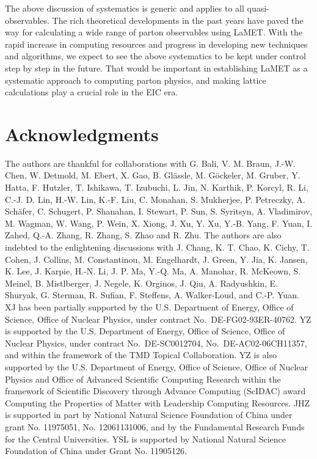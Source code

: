 \documentclass[aps,rmp,reprint,amsmath,amssymb,graphicx,longbibliography]{revtex4-1} %
\begin{document}
The above discussion of systematics is generic and applies to all quasi-observables. The rich theoretical developments in the past years have paved the way for calculating a wide range of parton observables using LaMET. With the rapid increase in computing resources and progress in developing new techniques and algorithms, we expect to see the above systematics to be kept under control step by step in the future. That would be important in establishing LaMET as a systematic approach to computing parton physics, and making lattice calculations play a crucial role in the EIC era.


\section*{Acknowledgments}

The authors are thankful for collaborations with G. Bali, V. M. Braun, J.-W. Chen, W. Detmold, M. Ebert, X. Gao, B. Gl\"assle, M. G\"ockeler, M. Gruber, Y. Hatta, F. Hutzler, T. Ishikawa, T. Izubuchi, L. Jin, N. Karthik, P. Korcyl, R. Li, C.-J. D. Lin, H.-W. Lin, K.-F. Liu, C. Monahan, S. Mukherjee, P. Petreczky, A. Sch\"{a}fer, C. Schugert, P. Shanahan, I. Stewart, P. Sun, S. Syritsyn, A. Vladimirov, M. Wagman, W. Wang, P. Wein, X. Xiong, J. Xu, Y. Xu, Y.-B. Yang, F. Yuan, I. Zahed, Q.-A. Zhang, R. Zhang, S. Zhao and R. Zhu. The authors are also indebted to the enlightening discussions with J. Chang, K. T. Chao, K. Cichy, T. Cohen, J. Collins, M. Constantinou, M. Engelhardt, J. Green, Y. Jia, K. Jansen, K. Lee, J. Karpie, H.-N. Li,
J. P. Ma, Y.-Q. Ma, A. Manohar, R. McKeown, S. Meinel, B. Mistlberger, J. Negele, K. Orginos, J. Qiu, A. Radyushkin, E. Shuryak, G. Sterman, R. Sufian, F. Steffens, A. Walker-Loud, and C.-P. Yuan. XJ has been partially supported by the U.S. Department of Energy, Office of Science, Office of Nuclear Physics, under contract No.~DE-FG02-93ER-40762. YZ is supported by the U.S. Department of Energy, Office of Science, Office of Nuclear Physics, under contract No.~DE-SC0012704, No.~DE-AC02-06CH11357, and within the framework of the TMD Topical Collaboration. YZ is also supported by the U.S. Department of Energy, Office of Science, Office of Nuclear Physics and Office of Advanced Scientific Computing Research within the framework of Scientific Discovery through Advance Computing (ScIDAC) award Computing the Properties of Matter with Leadership Computing Resources.
JHZ is supported in part by National Natural Science Foundation of China under grant No. 11975051, No. 12061131006, and by the Fundamental Research Funds for the Central Universities. YSL is supported by National Natural Science Foundation of China under Grant No. 11905126.
\end{document}
